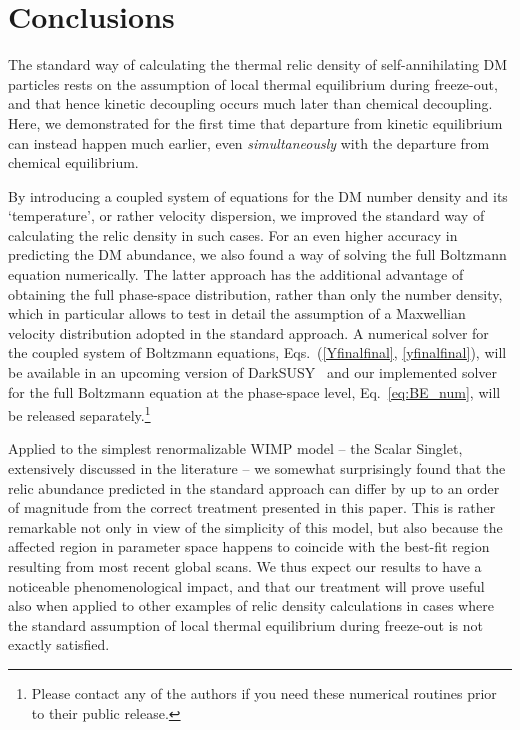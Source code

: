 \documentclass[twocolumn,showpacs,amsmath,amssymb,superscriptaddress,nofootinbib]{revtex4-1}
\newcommand{\ds}{{\sf DarkSUSY}}
\begin{document}
\section{Conclusions}
\label{sec:conc}

The standard 
way of calculating the thermal relic density of self-annihilating DM particles
rests on the assumption of local thermal equilibrium during freeze-out, and that hence
kinetic decoupling occurs much later than chemical decoupling. Here, we 
demonstrated for the first time that departure from kinetic equilibrium can instead
happen much earlier, even {\it simultaneously} with the departure from chemical 
equilibrium.

By introducing a coupled system of equations for the DM number density and its
`temperature', or rather velocity dispersion, we improved the standard way of calculating the
relic density in such cases. For an even higher accuracy in predicting the DM abundance, 
we also found a way of solving the full Boltzmann equation numerically. The latter approach
has the additional advantage of obtaining the full phase-space distribution, rather than 
only the number density, which in particular allows to test in detail the assumption of a 
Maxwellian velocity distribution adopted in the standard approach.
A numerical solver for the coupled system of Boltzmann equations, Eqs.~(\ref{Yfinalfinal},
\ref{yfinalfinal}), will be available in an upcoming version of \ds\ \cite{ds6} and
our implemented solver for the full Boltzmann equation at the phase-space 
level, Eq.~\eqref{eq:BE_num}, will be released separately.\footnote{%
Please contact any of the authors if you need these numerical routines prior to their
public release.
}

Applied to the simplest renormalizable WIMP model -- the Scalar Singlet, extensively
discussed in the literature -- we somewhat surprisingly found that the relic abundance 
predicted in the standard approach can differ by up to an order of magnitude 
from the correct treatment presented in this paper. This is rather remarkable not only in view 
of the simplicity of this model, but also because the affected region in parameter space 
happens to coincide with the best-fit region resulting from most recent global scans. 
We thus expect our results to have a noticeable phenomenological impact, and 
that our treatment will prove useful also when applied to other examples of relic density 
calculations in cases where the standard assumption of local thermal equilibrium during 
freeze-out is not exactly satisfied.
\end{document}
